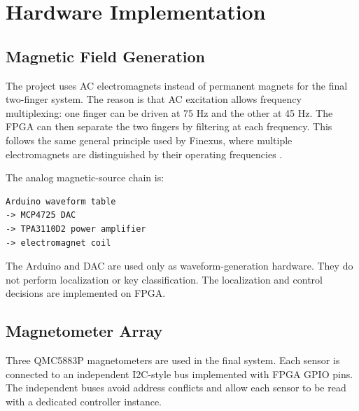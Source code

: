 \section{Hardware Implementation}
\label{sec:hardware_implementation}

\subsection{Magnetic Field Generation}

The project uses AC electromagnets instead of permanent magnets for the final two-finger system. The reason is that AC excitation allows frequency multiplexing: one finger can be driven at 75 Hz and the other at 45 Hz. The FPGA can then separate the two fingers by filtering at each frequency. This follows the same general principle used by Finexus, where multiple electromagnets are distinguished by their operating frequencies \cite{chen2016finexus}.

The analog magnetic-source chain is:

\begin{lstlisting}
Arduino waveform table
-> MCP4725 DAC
-> TPA3110D2 power amplifier
-> electromagnet coil
\end{lstlisting}

The Arduino and DAC are used only as waveform-generation hardware. They do not perform localization or key classification. The localization and control decisions are implemented on FPGA.


\subsection{Magnetometer Array}

Three QMC5883P magnetometers are used in the final system. Each sensor is connected to an independent I2C-style bus implemented with FPGA GPIO pins. The independent buses avoid address conflicts and allow each sensor to be read with a dedicated controller instance.

